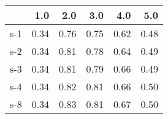 \begin{tabular}{lrrrrr}
\toprule
{} &  1.0 &  2.0 &  3.0 &  4.0 &  5.0 \\
\midrule
s-1 & 0.34 & 0.76 & 0.75 & 0.62 & 0.48 \\
s-2 & 0.34 & 0.81 & 0.78 & 0.64 & 0.49 \\
s-3 & 0.34 & 0.81 & 0.79 & 0.66 & 0.49 \\
s-4 & 0.34 & 0.82 & 0.81 & 0.66 & 0.50 \\
s-8 & 0.34 & 0.83 & 0.81 & 0.67 & 0.50 \\
\bottomrule
\end{tabular}
